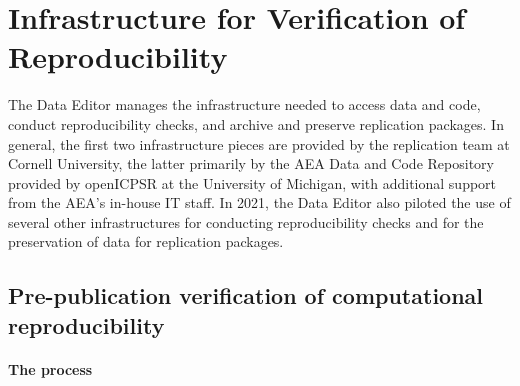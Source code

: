 \documentclass[PP]{AEA}
\newcommand{\aeadcr}{AEA Data and Code Repository}
\begin{document}
\section{Infrastructure for Verification of Reproducibility}
\label{sec:infrastructure}

The Data Editor manages the infrastructure needed to access data and code, conduct reproducibility checks, and archive and preserve replication packages. In general, the first two infrastructure pieces are provided by the replication team at Cornell University, the latter primarily by the  \aeadcr{} provided by openICPSR at the University of Michigan, with additional support from the AEA's in-house IT staff. In 2021, the Data Editor also piloted the use of several other infrastructures for  conducting reproducibility checks and for the preservation of data for replication packages.


\subsection{Pre-publication verification of computational reproducibility}
\label{sec:verification}

\paragraph{The process}
\end{document}
